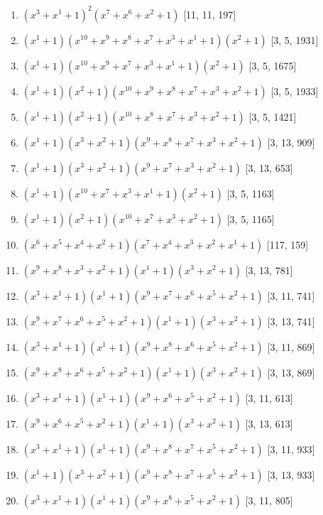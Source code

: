 \documentclass[10pt,twocolumn]{article}
\begin{document}
\begin{enumerate}
\item $(x^{3} + x^{1} + 1)^{2}(x^{7} + x^{6} + x^{2} + 1)$  [11, 11, 197]
\item $(x^{1} + 1)(x^{10} + x^{9} + x^{8} + x^{7} + x^{3} + x^{1} + 1)(x^{2} + 1)$  [3, 5, 1931]
\item $(x^{1} + 1)(x^{10} + x^{9} + x^{7} + x^{3} + x^{1} + 1)(x^{2} + 1)$  [3, 5, 1675]
\item $(x^{1} + 1)(x^{2} + 1)(x^{10} + x^{9} + x^{8} + x^{7} + x^{3} + x^{2} + 1)$  [3, 5, 1933]
\item $(x^{1} + 1)(x^{2} + 1)(x^{10} + x^{8} + x^{7} + x^{3} + x^{2} + 1)$  [3, 5, 1421]
\item $(x^{1} + 1)(x^{3} + x^{2} + 1)(x^{9} + x^{8} + x^{7} + x^{3} + x^{2} + 1)$  [3, 13, 909]
\item $(x^{1} + 1)(x^{3} + x^{2} + 1)(x^{9} + x^{7} + x^{3} + x^{2} + 1)$  [3, 13, 653]
\item $(x^{1} + 1)(x^{10} + x^{7} + x^{3} + x^{1} + 1)(x^{2} + 1)$  [3, 5, 1163]
\item $(x^{1} + 1)(x^{2} + 1)(x^{10} + x^{7} + x^{3} + x^{2} + 1)$  [3, 5, 1165]
\item $(x^{6} + x^{5} + x^{4} + x^{2} + 1)(x^{7} + x^{4} + x^{3} + x^{2} + x^{1} + 1)$  [117, 159]
\item $(x^{9} + x^{8} + x^{3} + x^{2} + 1)(x^{1} + 1)(x^{3} + x^{2} + 1)$  [3, 13, 781]
\item $(x^{3} + x^{1} + 1)(x^{1} + 1)(x^{9} + x^{7} + x^{6} + x^{5} + x^{2} + 1)$  [3, 11, 741]
\item $(x^{9} + x^{7} + x^{6} + x^{5} + x^{2} + 1)(x^{1} + 1)(x^{3} + x^{2} + 1)$  [3, 13, 741]
\item $(x^{3} + x^{1} + 1)(x^{1} + 1)(x^{9} + x^{8} + x^{6} + x^{5} + x^{2} + 1)$  [3, 11, 869]
\item $(x^{9} + x^{8} + x^{6} + x^{5} + x^{2} + 1)(x^{1} + 1)(x^{3} + x^{2} + 1)$  [3, 13, 869]
\item $(x^{3} + x^{1} + 1)(x^{1} + 1)(x^{9} + x^{6} + x^{5} + x^{2} + 1)$  [3, 11, 613]
\item $(x^{9} + x^{6} + x^{5} + x^{2} + 1)(x^{1} + 1)(x^{3} + x^{2} + 1)$  [3, 13, 613]
\item $(x^{3} + x^{1} + 1)(x^{1} + 1)(x^{9} + x^{8} + x^{7} + x^{5} + x^{2} + 1)$  [3, 11, 933]
\item $(x^{1} + 1)(x^{3} + x^{2} + 1)(x^{9} + x^{8} + x^{7} + x^{5} + x^{2} + 1)$  [3, 13, 933]
\item $(x^{3} + x^{1} + 1)(x^{1} + 1)(x^{9} + x^{8} + x^{5} + x^{2} + 1)$  [3, 11, 805]

\end{enumerate}
\end{document}
